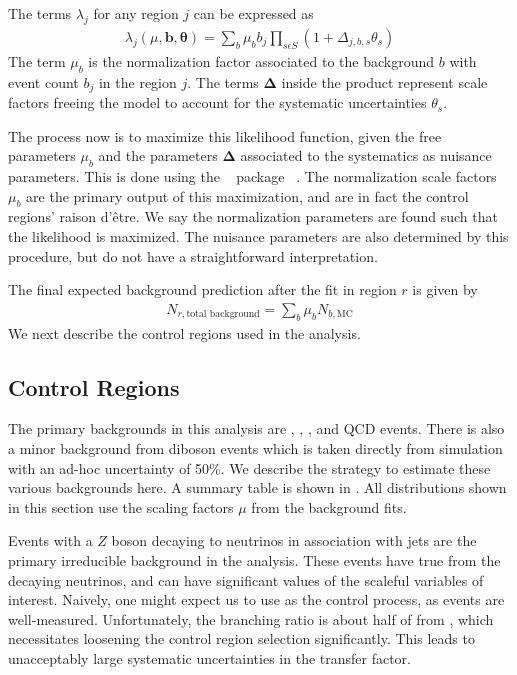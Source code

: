 The terms $\lambda_j$ for any region $j$ can be expressed as
\begin{align}
\lambda_j( \mu, \bm{b},\bm{\theta}) = \sum_b \mu_b \xspace b_j \xspace \prod_{s\epsilon S} \xspace (1 + \Delta_{j,b,s} \theta_s)
\end{align}
The term $\mu_b$ is the normalization factor associated to the background $b$ with event count $b_j$ in the region $j$.
The terms $\bm{\Delta}$ inside the product represent scale factors freeing the model to account for the systematic uncertainties $\theta_s$.

The process now is to maximize this likelihood function, given the free parameters $\mu_b$ and the parameters $\bm{\Delta}$ associated to the systematics as nuisance parameters.
This is done using the \histfitter~ package ~\cite{Baak:2014wma}.
The normalization scale factors $\mu_b$ are the primary output of this maximization, and are in fact the control regions' raison d'\^{e}tre.
We say the normalization parameters are found such that the likelihood is maximized.
The nuisance parameters are also determined by this procedure, but do not have a straightforward interpretation.

The final expected background prediction after the fit in region $r$ is given by
\begin{align}
N_{r,\text{total background}} = \sum_b \mu_b N_{b, \text{MC}}
\end{align}
We next describe the control regions used in the analysis.

\subsection{Control Regions}

The primary backgrounds in this analysis are \zjets, \wjets, \ttbar, and QCD events.
There is also a minor background from diboson events which is taken directly from simulation with an ad-hoc uncertainty of 50\%.
We describe the strategy to estimate these various backgrounds here.
A summary table is shown in .
All distributions shown in this section use the scaling factors $\mu$ from the background fits.


Events with a $Z$ boson decaying to neutrinos in association with jets are the primary irreducible background in the analysis.
These events have true \met from the decaying neutrinos, and can have significant values of the scaleful variables of interest.
Naively, one might expect us to use \Zll as the control process, as \Zll events are well-measured.
Unfortunately, the \Zll branching ratio is about half of from \Zvv, which necessitates loosening the control region selection significantly.
This leads to unacceptably large systematic uncertainties in the transfer factor.

